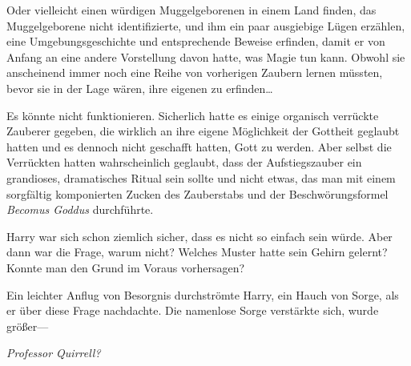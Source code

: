 Oder vielleicht einen würdigen Muggelgeborenen in einem Land finden, das Muggelgeborene nicht identifizierte, und ihm ein paar ausgiebige Lügen erzählen, eine Umgebungsgeschichte und entsprechende Beweise erfinden, damit er von Anfang an eine andere Vorstellung davon hatte, was Magie tun kann. Obwohl sie anscheinend immer noch eine Reihe von vorherigen Zaubern lernen müssten, bevor sie in der Lage wären, ihre eigenen zu erfinden…

Es könnte nicht funktionieren. Sicherlich hatte es einige organisch verrückte Zauberer gegeben, die wirklich an ihre eigene Möglichkeit der Gottheit geglaubt hatten und es dennoch nicht geschafft hatten, Gott zu werden. Aber selbst die Verrückten hatten wahrscheinlich geglaubt, dass der Aufstiegszauber ein grandioses, dramatisches Ritual sein sollte und nicht etwas, das man mit einem sorgfältig komponierten Zucken des Zauberstabs und der Beschwörungsformel \emph{Becomus Goddus} durchführte.

Harry war sich schon ziemlich sicher, dass es nicht so einfach sein würde.
Aber dann war die Frage, warum nicht? Welches Muster hatte sein Gehirn gelernt? Konnte man den Grund im Voraus vorhersagen?

Ein leichter Anflug von Besorgnis durchströmte Harry, ein Hauch von Sorge, als er über diese Frage nachdachte. Die namenlose Sorge verstärkte sich, wurde größer—

\emph{Professor Quirrell?}

